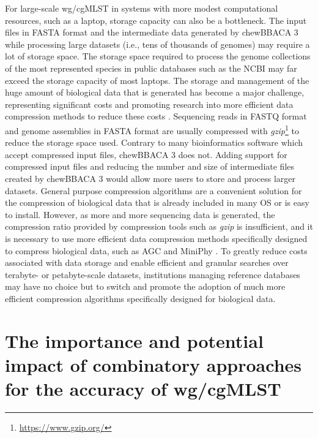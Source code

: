 For large-scale \ac{wg/cgMLST} in systems with more modest computational resources, such as a laptop, storage capacity can also be a bottleneck. The input files in FASTA format and the intermediate data generated by chewBBACA 3 while processing large datasets (i.e., tens of thousands of genomes) may require a lot of storage space. The storage space required to process the genome collections of the most represented species in public databases such as the \ac{NCBI} may far exceed the storage capacity of most laptops. The storage and management of the huge amount of biological data that is generated has become a major challenge, representing significant costs and promoting research into more efficient data compression methods to reduce these costs \cite{chaudhari_biological_2024, betschart_benchmark_2025, nazari_lossless_2025}. Sequencing reads in FASTQ format and genome assemblies in FASTA format are usually compressed with \textit{gzip}\footnote{\url{https://www.gzip.org/}} to reduce the storage space used. Contrary to many bioinformatics software which accept compressed input files, chewBBACA 3 does not. Adding support for compressed input files and reducing the number and size of intermediate files created by chewBBACA 3 would allow more users to store and process larger datasets. General purpose compression algorithms are a convenient solution for the compression of biological data that is already included in many \ac{OS} or is easy to install. However, as more and more sequencing data is generated, the compression ratio provided by compression tools such as \textit{gzip} is insufficient, and it is necessary to use more efficient data compression methods specifically designed to compress biological data, such as AGC and MiniPhy \cite{deorowicz_agc_2023, brinda_efficient_2025}. To greatly reduce costs associated with data storage and enable efficient and granular searches over terabyte- or petabyte-scale datasets, institutions managing reference databases may have no choice but to switch and promote the adoption of much more efficient compression algorithms specifically designed for biological data.

\section{The importance and potential impact of combinatory approaches for the accuracy of wg/cgMLST}

